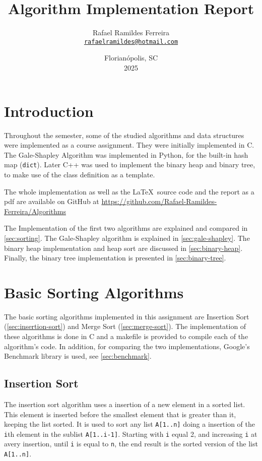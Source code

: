 \documentclass[a4paper,12pt,twocolumn]{article}
\title{Algorithm Implementation Report}
\author{Rafael Ramildes Ferreira \\ \href{mailto:rafaelramildes@hotmail.com}{\texttt{rafaelramildes@hotmail.com}}}
\date{Florianópolis, SC \\ 2025}
\begin{document}
\maketitle

\section*{Introduction}

Throughout the semester, some of the studied algorithms and data structures were implemented as a course assignment. They were initially implemented in C. The Gale-Shapley Algorithm was implemented in Python, for the built-in hash map (\texttt{dict}). Later C++ was used to implement the binary heap and binary tree, to make use of the class definition as a template.

The whole implementation as well as the \LaTeX\ source code and the report as a pdf are available on GitHub at \url{https://github.com/Rafael-Ramildes-Ferreira/Algorithms}

The Implementation of the first two algorithms are explained and compared in \autoref{sec:sorting}. The Gale-Shapley algorithm is explained in \autoref{sec:gale-shapley}. The binary heap implementation and heap sort are discussed in \autoref{sec:binary-heap}. Finally, the binary tree implementation is presented in \autoref{sec:binary-tree}.

\section{Basic Sorting Algorithms}
\label{sec:sorting}

The basic sorting algorithms implemented in this assignment are Insertion Sort (\autoref{sec:insertion-sort}) and Merge Sort (\autoref{sec:merge-sort}). The implementation of these algorithms is done in C and a makefile is provided to compile each of the algorithm's code. In addition, for comparing the two implementations, Google's Benchmark library is used, see \autoref{sec:benchmark}.

\subsection{Insertion Sort}
\label{sec:insertion-sort}
The insertion sort algorithm uses a insertion of a new element in a sorted list. This element is inserted before the smallest element that is greater than it, keeping the list sorted. It is used to sort any list \verb|A[1..n]| doing a insertion of the \verb|i|th element in the sublist \verb|A[1..i-1]|. Starting with \verb|i| equal 2, and increasing \verb|i| at avery insertion, until \verb|i| is equal to \verb|n|, the end result is the sorted version of the list \verb|A[1..n]|.
\end{document}
